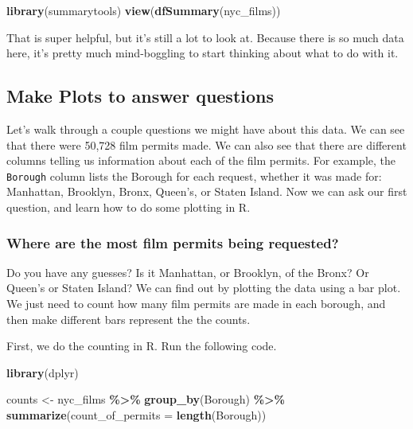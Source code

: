 \documentclass[
]{book}
\newenvironment{Shaded}{\begin{snugshade}}{\end{snugshade}}
\newcommand{\AttributeTok}[1]{\textcolor[rgb]{0.13,0.29,0.53}{#1}}
\newcommand{\FunctionTok}[1]{\textcolor[rgb]{0.13,0.29,0.53}{\textbf{#1}}}
\newcommand{\NormalTok}[1]{#1}
\newcommand{\OtherTok}[1]{\textcolor[rgb]{0.56,0.35,0.01}{#1}}
\newcommand{\SpecialCharTok}[1]{\textcolor[rgb]{0.81,0.36,0.00}{\textbf{#1}}}
\begin{document}
\begin{Shaded}
\begin{Highlighting}[]
\FunctionTok{library}\NormalTok{(summarytools)}
\FunctionTok{view}\NormalTok{(}\FunctionTok{dfSummary}\NormalTok{(nyc\_films))}
\end{Highlighting}
\end{Shaded}

That is super helpful, but it's still a lot to look at. Because there is so much data here, it's pretty much mind-boggling to start thinking about what to do with it.

\hypertarget{make-plots-to-answer-questions}{%
\subsection{Make Plots to answer questions}\label{make-plots-to-answer-questions}}

Let's walk through a couple questions we might have about this data. We can see that there were 50,728 film permits made. We can also see that there are different columns telling us information about each of the film permits. For example, the \texttt{Borough} column lists the Borough for each request, whether it was made for: Manhattan, Brooklyn, Bronx, Queen's, or Staten Island. Now we can ask our first question, and learn how to do some plotting in R.

\hypertarget{where-are-the-most-film-permits-being-requested}{%
\subsubsection{Where are the most film permits being requested?}\label{where-are-the-most-film-permits-being-requested}}

Do you have any guesses? Is it Manhattan, or Brooklyn, of the Bronx? Or Queen's or Staten Island? We can find out by plotting the data using a bar plot. We just need to count how many film permits are made in each borough, and then make different bars represent the the counts.

First, we do the counting in R. Run the following code.

\begin{Shaded}
\begin{Highlighting}[]
\FunctionTok{library}\NormalTok{(dplyr)}

\NormalTok{counts }\OtherTok{\textless{}{-}}\NormalTok{ nyc\_films }\SpecialCharTok{\%\textgreater{}\%}
          \FunctionTok{group\_by}\NormalTok{(Borough) }\SpecialCharTok{\%\textgreater{}\%}
          \FunctionTok{summarize}\NormalTok{(}\AttributeTok{count\_of\_permits =} \FunctionTok{length}\NormalTok{(Borough))}
\end{Highlighting}
\end{Shaded}
\end{document}
